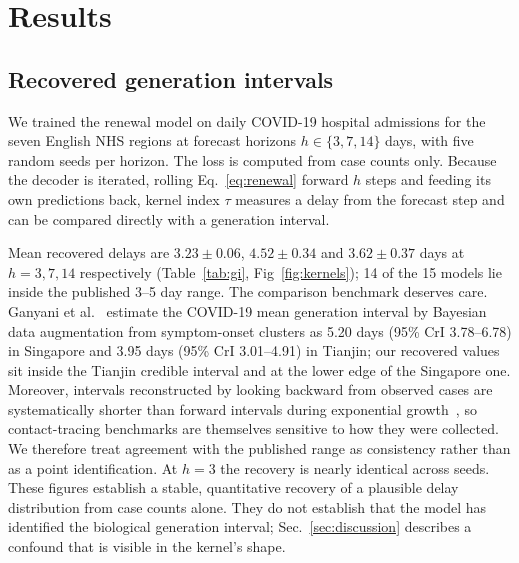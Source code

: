 \documentclass[10pt,letterpaper]{article}
\begin{document}
\section{Results}

\subsection{Recovered generation intervals}
\label{sec:gi}

We trained the renewal model on daily COVID-19 hospital admissions for the
seven English NHS regions at forecast horizons $h\in\{3,7,14\}$ days, with
five random seeds per horizon. The loss is computed from case counts only.
Because the decoder is iterated, rolling Eq.~\eqref{eq:renewal} forward $h$
steps and feeding its own predictions back, kernel index $\tau$ measures a
delay from the forecast step and can be compared directly with a generation
interval.

\begin{table}[ht]
\centering
\caption{Mean delay of the learned kernel $\alpha_\tau$ ($\tau=1..7$ days) per
horizon, over five independently seeded models. Contact-tracing estimates of
the COVID-19 generation interval are approximately 3--5
days~\cite{ferretti2020quantifying}.}

\label{tab:gi}
\end{table}

Mean recovered delays are $3.23\pm0.06$, $4.52\pm0.34$ and $3.62\pm0.37$ days
at $h=3,7,14$ respectively (Table~\ref{tab:gi}, Fig~\ref{fig:kernels}); 14
of the 15 models lie inside the published 3--5 day range. The comparison
benchmark deserves care. Ganyani et al.~\cite{ganyani2020estimating} estimate
the COVID-19 mean generation interval by Bayesian data augmentation from
symptom-onset clusters as 5.20 days (95\% CrI 3.78--6.78) in Singapore and
3.95 days (95\% CrI 3.01--4.91) in Tianjin; our recovered values sit inside the
Tianjin credible interval and at the lower edge of the Singapore one. Moreover,
intervals reconstructed by looking backward from observed cases are
systematically shorter than forward intervals during exponential
growth~\cite{park2021forward}, so contact-tracing benchmarks are themselves
sensitive to how they were collected. We therefore treat agreement with the
published range as consistency rather than as a point identification. At $h=3$ the
recovery is nearly identical across seeds. These figures establish a stable,
quantitative recovery of a plausible delay distribution from case counts
alone. They do not establish that the model has identified the biological
generation interval; Sec.~\ref{sec:discussion} describes a confound that is
visible in the kernel's shape.
\end{document}
